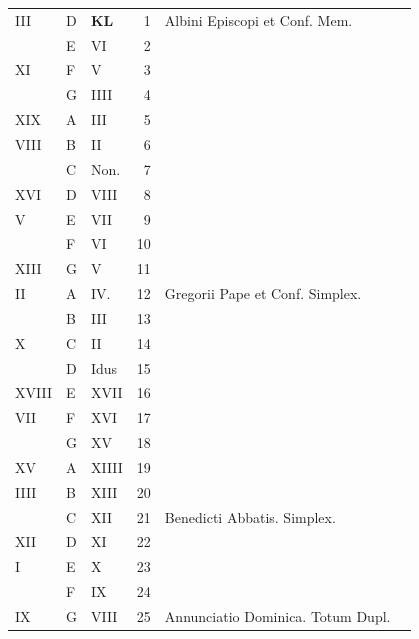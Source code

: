 \begin{center}
\begin{tabular}{l | l | l | r | l l}
\color{Red} III & D & \textbf{\color{Red} K\color{Blue}L} & 1 & \color{Red} Albini Episcopi et Conf. Mem. \\
\color{Red}  & E & \color{Red} VI & 2 & & \color{Red} \\
\color{Red} XI & F & \color{Red} V & 3 & \\
\color{Red}  & G & \color{Red} IIII & 4 & & \color{Red} \\
\color{Red} XIX & \color{Red} A & \color{Red} III & 5 & \\
\color{Red} VIII & B & \color{Red} II & 6 & \\
\color{Red}  & C & \color{Red} Non. & 7 & & \color{Red} \\
\color{Red} XVI & D & \color{Red} VIII & 8 & & \color{Red} \\
\color{Red} V & E & \color{Red} VII & 9 & & \color{Red} \\
\color{Red}  & F & \color{Red} VI & 10 & & \color{Red} \\
\color{Red} XIII & G & \color{Red} V & 11 & \\
\color{Red} II & \color{Red} A & \color{Red} IV. & 12 & \color{Red} Gregorii Pape et Conf. Simplex. \\
\color{Red}  & B & \color{Red} III & 13 & & \color{Red} \\
\color{Red} X & C & \color{Red} II & 14 & \\
\color{Red}  & D & \color{Red} Idus & 15 & \\
\color{Red} XVIII & E & \color{Red} XVII & 16 & \\
\color{Red} VII & F & \color{Red} XVI & 17 & & \color{Red} \\
\color{Red}  & G & \color{Red} XV & 18 & \\
\color{Red} XV & \color{Red} A & \color{Red} XIIII & 19 & & \color{Red} \\
\color{Red} IIII & B & \color{Red} XIII & 20 & & \color{Red} \\
\color{Red}  & C & \color{Red} XII & 21 & \color{Red} Benedicti Abbatis. Simplex. \\
\color{Red} XII & D & \color{Red} XI & 22 & \\
\color{Red} I & E & \color{Red} X & 23 & & \color{Red} \\
\color{Red}  & F & \color{Red} IX & 24 & & \color{Red} \\
\color{Red} IX & G & \color{Red} VIII & 25 & Annunciatio Dominica. Totum Dupl.& \color{Red} \\

\end{tabular}
\end{center}
